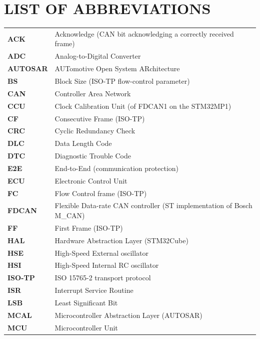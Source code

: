 \chapter*{LIST OF ABBREVIATIONS}

{\small
\renewcommand{\arraystretch}{0.9}
\begin{longtable}{@{}p{3.2cm} p{11cm}@{}}
\textbf{ACK}      & Acknowledge (CAN bit acknowledging a correctly received frame) \\
\textbf{ADC}      & Analog-to-Digital Converter \\
\textbf{AUTOSAR}  & AUTomotive Open System ARchitecture \\
\textbf{BS}       & Block Size (ISO-TP flow-control parameter) \\
\textbf{CAN}      & Controller Area Network \\
\textbf{CCU}      & Clock Calibration Unit (of FDCAN1 on the STM32MP1) \\
\textbf{CF}       & Consecutive Frame (ISO-TP) \\
\textbf{CRC}      & Cyclic Redundancy Check \\
\textbf{DLC}      & Data Length Code \\
\textbf{DTC}      & Diagnostic Trouble Code \\
\textbf{E2E}      & End-to-End (communication protection) \\
\textbf{ECU}      & Electronic Control Unit \\
\textbf{FC}       & Flow Control frame (ISO-TP) \\
\textbf{FDCAN}    & Flexible Data-rate CAN controller (ST implementation of Bosch M\_CAN) \\
\textbf{FF}       & First Frame (ISO-TP) \\
\textbf{HAL}      & Hardware Abstraction Layer (STM32Cube) \\
\textbf{HSE}      & High-Speed External oscillator \\
\textbf{HSI}      & High-Speed Internal RC oscillator \\
\textbf{ISO-TP}   & ISO 15765-2 transport protocol \\
\textbf{ISR}      & Interrupt Service Routine \\
\textbf{LSB}      & Least Significant Bit \\
\textbf{MCAL}     & Microcontroller Abstraction Layer (AUTOSAR) \\
\textbf{MCU}      & Microcontroller Unit \\

\end{longtable}}
